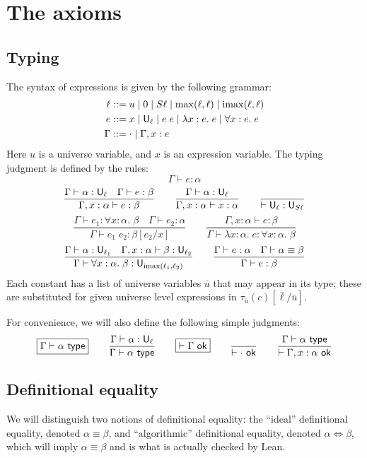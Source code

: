 \section{The axioms}

\subsection{Typing}

The syntax of expressions is given by the following grammar:
\begin{align*}
\ell&::=u\mid 0\mid S\ell\mid \max(\ell,\ell)\mid \imax(\ell,\ell)\\
e&::=x\mid \U_\ell\mid e\;e\mid \lambda x:e.\;e\mid \forall x:e.\;e\\
\Gamma&::=\cdot\mid \Gamma,x:e
\end{align*}
Here $u$ is a universe variable, and $x$ is an expression variable. The typing judgment is defined by the rules:
$$\boxed{\Gamma\vdash e:\alpha}$$
$$\frac{\Gamma\vdash \alpha:\U_\ell\quad \Gamma\vdash e:\beta}{\Gamma,x:\alpha\vdash e:\beta}\qquad
\frac{\Gamma\vdash \alpha:\U_\ell}{\Gamma,x:\alpha\vdash x:\alpha}\qquad
\frac{}{\vdash\U_\ell:\U_{S\ell}}$$
$$\frac{\Gamma\vdash e_1:\forall x:\alpha.\;\beta\quad\Gamma\vdash e_2:\alpha}{\Gamma\vdash e_1\;e_2:\beta[e_2/x]}\qquad
\frac{\Gamma,x:\alpha\vdash e:\beta}{\Gamma\vdash\lambda x:\alpha.\;e:\forall x:\alpha.\;\beta}$$
$$\frac{\Gamma\vdash\alpha:\U_{\ell_1}\quad\Gamma,x:\alpha\vdash \beta:\U_{\ell_2}}{\Gamma\vdash\forall x:\alpha.\;\beta:\U_{\imax(\ell_1,\ell_2)}}\qquad
\frac{\Gamma\vdash e:\alpha\quad \Gamma\vdash\alpha\equiv\beta}{\Gamma\vdash e:\beta}$$
Each constant has a list of universe variables $\bar u$ that may appear in its type; these are substituted for given universe level expressions in $\tau_{\bar u}(c)[\bar\ell/\bar u]$.

For convenience, we will also define the following simple judgments:
$$\boxed{\Gamma\vdash\alpha\type}\qquad
\frac{\Gamma\vdash\alpha:\U_\ell}{\Gamma\vdash\alpha\type}\qquad
\boxed{\vdash\Gamma\ok}\qquad\frac{}{\vdash \cdot\ok}\qquad\frac{\Gamma\vdash\alpha\type}{\vdash \Gamma,x:\alpha\ok}$$
\subsection{Definitional equality}

We will distinguish two notions of definitional equality: the ``ideal'' definitional equality, denoted $\alpha\equiv\beta$, and ``algorithmic'' definitional equality, denoted $\alpha\Leftrightarrow\beta$, which will imply $\alpha\equiv\beta$ and is what is actually checked by Lean.


